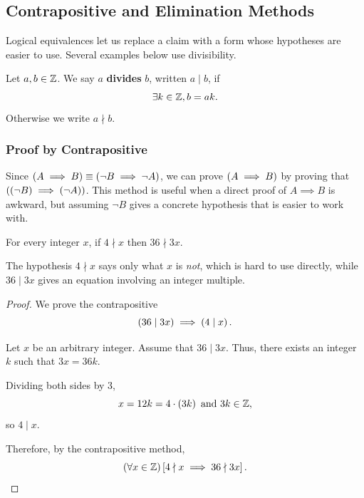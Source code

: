 \subsection{Contrapositive and Elimination Methods}
Logical equivalences let us replace a claim with a form whose hypotheses
are easier to use. Several examples below use divisibility.
\begin{definition}[Divisibility]
    Let $a, b \in \mathbb{Z}$. We say $a$ \textbf{divides} $b$, written $a \mid b$, if
    \begin{equation*}
        \exists k \in \mathbb{Z}, b = ak.
    \end{equation*}
    Otherwise we write $a \nmid b$.
\end{definition}

\subsubsection{Proof by Contrapositive}
\begin{definition}
    Since $\left(A \implies B\right) \equiv \left(\neg B \implies \neg A \right)$,
    we can prove $\left(A \implies B\right)$ by proving that $\left(\left(\neg B\right) \implies \left(\neg A\right)\right)$.
    This method is useful when a direct proof of $A \implies B$ is awkward, but assuming
    $\neg B$ gives a concrete hypothesis that is easier to work with.
\end{definition}

\begin{proposition}
    For every integer $x$, if $4 \nmid x$ then $36 \nmid 3x$.
\end{proposition}
\begin{remark}
    The hypothesis $4 \nmid x$ says only what $x$ is \emph{not}, which is hard to use directly,
    while $36\mid 3x$ gives an equation involving an integer multiple.
\end{remark}
\begin{proof}
    We prove the contrapositive
    \begin{equation*}
        \left(36 \mid 3x \right) \implies \left(4 \mid x\right).
    \end{equation*}

    Let $x$ be an arbitrary integer. Assume that $36 \mid 3x$. Thus, there exists an integer $k$
    such that $3x = 36k$.

    Dividing both sides by $3$,
    \begin{equation*}
        x = 12k = 4 \cdot \left(3k\right) \text{ and } 3k \in \mathbb{Z},
    \end{equation*}
    so $4 \mid x$.

    Therefore, by the contrapositive method,
    \begin{equation*}
        \left(\forall x \in \mathbb{Z} \right)\left[4 \nmid x \implies 36 \nmid 3x\right].
    \end{equation*}
\end{proof}

